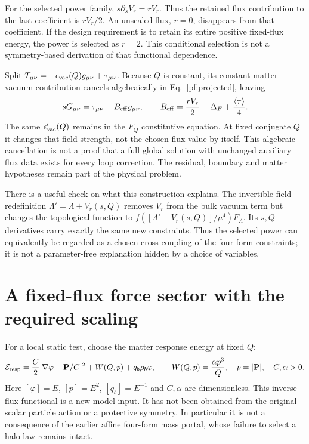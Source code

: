 \documentclass[11pt]{article}
\begin{document}
For the selected power family, $s\partial_sV_r=rV_r$. Thus the retained
flux contribution to the last coefficient is $rV_r/2$.
An unscaled flux, $r=0$, disappears from that coefficient. If the design
requirement is to retain its entire positive fixed-flux energy, the power
is selected as $r=2$. This conditional selection is not a symmetry-based
derivation of that functional dependence.

Split $T_{\mu\nu}=-\epsilon_{\rm vac}(Q)g_{\mu\nu}
+\tau_{\mu\nu}$. Because $Q$ is constant, its constant matter vacuum
contribution cancels algebraically in Eq.~\eqref{pf:projected}, leaving
\begin{equation}
 sG_{\mu\nu}=\tau_{\mu\nu}-B_{\rm eff}g_{\mu\nu},\qquad
 B_{\rm eff}={rV_r\over2}+\Delta_F+{\langle\tau\rangle\over4}.
 \label{pf:Beff}
\end{equation}
The same $\epsilon_{\rm vac}'(Q)$ remains in the $F_Q$ constitutive
equation. At fixed conjugate $Q$ it changes that field strength, not the
chosen flux value by itself. This algebraic cancellation is not a proof
that a full global solution with unchanged auxiliary flux data exists
for every loop correction. The residual, boundary and matter hypotheses
remain part of the physical problem.

There is a useful check on what this construction explains. The invertible
field redefinition $\Lambda'=\Lambda+V_r(s,Q)$ removes $V_r$ from the
bulk vacuum term but changes the topological function to
$f([\Lambda'-V_r(s,Q)]/\mu^4)F_\Lambda$. Its $s,Q$ derivatives carry
exactly the same new constraints. Thus the selected power can equivalently
be regarded as a chosen cross-coupling of the four-form constraints; it
is not a parameter-free explanation hidden by a choice of variables.

\section{A fixed-flux force sector with the required scaling}
For a local static test, choose the matter response energy at fixed $Q$:
\begin{equation}
 \mathcal E_{\rm resp}={C\over2}
       |\nabla\varphi-\mathbf P/C|^2
       +W(Q,p)+q_b\rho_b\varphi,\qquad
 W(Q,p)={\alpha p^3\over Q},\quad p=|\mathbf P|,
 \quad C,\alpha>0.
 \label{pf:force}
\end{equation}
Here $[\varphi]=E$, $[p]=E^2$, $[q_b]=E^{-1}$ and $C,\alpha$ are
dimensionless. This inverse-flux functional is a new model input. It has
not been obtained from the original scalar particle action or a protective
symmetry. In particular it is not a consequence of the earlier affine
four-form mass portal, whose failure to select a halo law remains intact.
\end{document}
